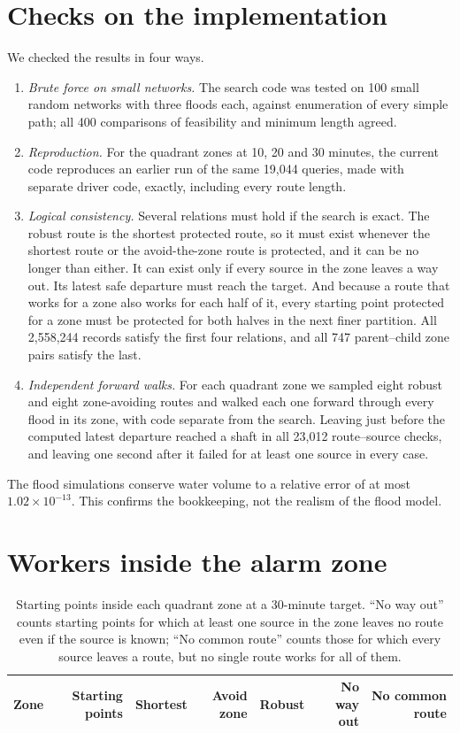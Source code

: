 \documentclass[11pt,a4paper]{article}
\begin{document}
\section{Checks on the implementation}\label{app:checks}
We checked the results in four ways.
\begin{enumerate}
\item \emph{Brute force on small networks.} The search code was tested on 100 small random networks with three floods each, against enumeration of every simple path; all 400 comparisons of feasibility and minimum length agreed.
\item \emph{Reproduction.} For the quadrant zones at 10, 20 and 30 minutes, the current code reproduces an earlier run of the same 19,044 queries, made with separate driver code, exactly, including every route length.
\item \emph{Logical consistency.} Several relations must hold if the search is exact. The robust route is the shortest protected route, so it must exist whenever the shortest route or the avoid-the-zone route is protected, and it can be no longer than either. It can exist only if every source in the zone leaves a way out. Its latest safe departure must reach the target. And because a route that works for a zone also works for each half of it, every starting point protected for a zone must be protected for both halves in the next finer partition. All 2,558,244 records satisfy the first four relations, and all 747 parent--child zone pairs satisfy the last.
\item \emph{Independent forward walks.} For each quadrant zone we sampled eight robust and eight zone-avoiding routes and walked each one forward through every flood in its zone, with code separate from the search. Leaving just before the computed latest departure reached a shaft in all 23,012 route--source checks, and leaving one second after it failed for at least one source in every case.
\end{enumerate}
The flood simulations conserve water volume to a relative error of at most $1.02\times10^{-13}$. This confirms the bookkeeping, not the realism of the flood model.

\section{Workers inside the alarm zone}\label{app:inside}
\begin{table}[htbp]
\centering\small
\caption{Starting points inside each quadrant zone at a 30-minute target. ``No way out'' counts starting points for which at least one source in the zone leaves no route even if the source is known; ``No common route'' counts those for which every source leaves a route, but no single route works for all of them.}
\begin{tabular}{@{}lrrrrrr@{}}\toprule
Zone & Starting points & Shortest & Avoid zone & Robust & No way out & No common route\\\midrule

\end{tabular}
\end{table}
\end{document}
